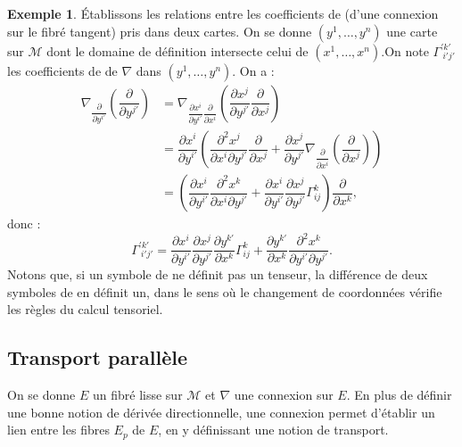 \documentclass[12pt,a4paper]{article}
\theoremstyle{definition}
\newtheorem{ex}[thm]{Exemple}
\begin{document}
\begin{ex}
Établissons les relations entre les coefficients de  (d'une connexion sur le fibré tangent) pris dans deux cartes.\newline
On se donne $(y^1,\ldots,y^n)$ une carte sur $\mathcal{M}$ dont le domaine de définition intersecte celui de $(x^1,\ldots,x^n)$.\newline On note $\Gamma_{~i'j'}^{'k'}$ les coefficients de  de $\nabla$ dans $(y^1,\ldots,y^n)$.
On a :
\begin{align*}
\nabla_{\dfrac{\partial}{\partial y^{i'}}}\left(\dfrac{\partial}{\partial y^{j'}}\right)&=\nabla_{\dfrac{\partial x^i}{\partial y^{i'}}\dfrac{\partial}{\partial x^i}}\left(\dfrac{\partial x^j}{\partial y^{j'}}\dfrac{\partial}{\partial x^j}\right)\\&=\dfrac{\partial x^i}{\partial y^{i'}}\left(\dfrac{\partial^2x^j}{\partial x^i\partial y^{j'}}\dfrac{\partial}{\partial x^j}+\dfrac{\partial x^j}{\partial y^{j'}}\nabla_{\dfrac{\partial}{\partial x^i}}\left(\dfrac{\partial}{\partial x^j}\right)\right)\\&=\left(\dfrac{\partial x^i}{\partial y^{i'}}\dfrac{\partial^2x^k}{\partial x^i\partial y^{j'}}+\dfrac{\partial x^i}{\partial y^{i'}}\dfrac{\partial x^j}{\partial y^{j'}}\Gamma_{ij}^k\right)\dfrac{\partial}{\partial x^k},
\end{align*}
donc :
$$
\Gamma_{~i'j'}^{'k'}=\dfrac{\partial x^i}{\partial y^{i'}}\dfrac{\partial x^j}{\partial y^{j'}}\dfrac{\partial y^{k'}}{\partial x^k}\Gamma_{ij}^k+\dfrac{\partial y^{k'}}{\partial x^k}\dfrac{\partial^2x^k}{\partial y^{i'}\partial y^{j'}}.
$$
Notons que, si un symbole de  ne définit pas un tenseur, la différence de deux symboles de  en définit un, dans le sens où le changement de coordonnées vérifie les règles du calcul tensoriel.
\end{ex}
\newpage
\subsection{Transport parallèle}
On se donne $E$ un fibré lisse sur $\mathcal{M}$ et $\nabla$ une connexion sur $E$. En plus de définir une bonne notion de dérivée directionnelle, une connexion permet d'établir un lien entre les fibres $E_p$ de $E$, en y définissant une notion de transport.\newline
\end{document}

